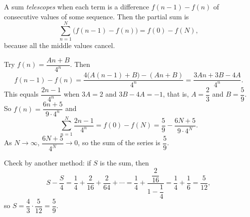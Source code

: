 A sum \emph{telescopes} when each term is a difference $f(n-1)-f(n)$ of consecutive values of some sequence. Then the partial sum is
\[
\sum_{n=1}^{N}\big(f(n-1)-f(n)\big)=f(0)-f(N),
\]
because all the middle values cancel.

Try $f(n)=\dfrac{An+B}{4^n}$. Then
\[
f(n-1)-f(n)=\dfrac{4\big(A(n-1)+B\big)-(An+B)}{4^n}=\dfrac{3An+3B-4A}{4^n}.
\]
This equals $\dfrac{2n-1}{4^n}$ when $3A=2$ and $3B-4A=-1$, that is, $A=\dfrac{2}{3}$ and $B=\dfrac{5}{9}$. So $f(n)=\dfrac{6n+5}{9\cdot4^n}$ and
\[
\sum_{n=1}^{N}\dfrac{2n-1}{4^n}=f(0)-f(N)=\dfrac{5}{9}-\dfrac{6N+5}{9\cdot4^N}.
\]
As $N\to\infty$, $\dfrac{6N+5}{4^N}\to0$, so the sum of the series is $\boxed{\dfrac{5}{9}}$.

Check by another method: if $S$ is the sum, then
\[
S-\dfrac {S}{4}=\dfrac{1}{4}+\dfrac{2}{16}+\dfrac{2}{64}+\cdots=\dfrac{1}{4}+\dfrac{\dfrac{2}{16}}{1-\dfrac{1}{4}}=\dfrac{1}{4}+\dfrac{1}{6}=\dfrac{5}{12},
\]
so $S=\dfrac{4}{3}\cdot\dfrac{5}{12}=\dfrac{5}{9}$.
